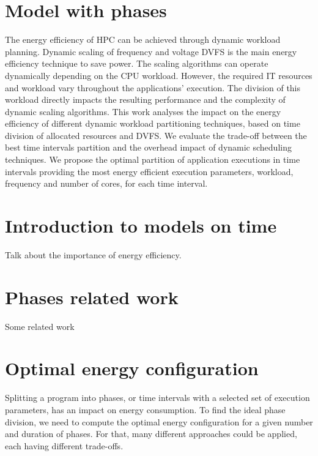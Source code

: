 
\section{Model with phases} \label{sec:model_with_phases}

The energy efficiency of HPC can be achieved through dynamic workload planning. Dynamic scaling of frequency and voltage DVFS is the main energy efficiency technique to save power. The scaling algorithms can operate dynamically depending on the CPU workload. However, the required IT resources and workload vary throughout the applications' execution. The division of this workload directly impacts the resulting performance and the complexity of dynamic scaling algorithms. This work analyses the impact on the energy efficiency of different dynamic workload partitioning techniques, based on time division of allocated resources and DVFS. We evaluate the trade-off between the best time intervals partition and the overhead impact of dynamic scheduling techniques. We propose the optimal partition of application executions in time intervals providing the most energy efficient execution parameters, workload, frequency and number of cores, for each time interval.

\section{Introduction to models on time} \label{sec:introduction_to_models_on_time}
Talk about the importance of energy efficiency.

\section{Phases related work} \label{sec:related_work_phases}
Some related work

\section{Optimal energy configuration} \label{sec:Optimal_energy_configuration}
Splitting a program into phases, or time intervals with a selected set of execution parameters, has an impact on energy consumption. To find the ideal phase division, we need to compute the optimal energy configuration for a given number and duration of phases. For that, many different approaches could be applied, each having different trade-offs. 

